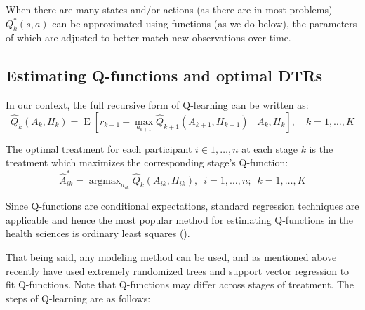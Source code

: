 \documentclass[12pt]{article}
\DeclareMathOperator*{\argmax}{argmax}
\begin{document}
When there are many states and/or actions (as there are in most problems) \( Q^{*}_{k}(s, a) \) can be approximated using functions (as we do below), the parameters of which are adjusted to better match new observations over time. %

\subsection{Estimating Q-functions and optimal DTRs} %
\label{sub:estimating_q_functions}

In our context, the full recursive form of Q-learning can be written as:
  \begin{equation}
     \hat{Q}_{k}(A_{k}, H_{k})  = \operatorname{E}[r_{k+1} + \max_{a_{k+1}} \hat{Q}_{k+1}(A_{k+1}, H_{k+1}) \mid A_{k}, H_{k}], \quad k = 1, \ldots, K
  \end{equation}
  
The optimal treatment for each participant $i \in 1, \ldots, n$ at each stage $k$ is the treatment which maximizes the corresponding stage's Q-function:
  \begin{equation}
    \hat{A}^{*}_{ik} = \argmax_{a_{ik}} \hat{Q}_{k}(A_{ik}, H_{ik}), \enspace i = 1, \ldots, n; \enspace k = 1, \ldots, K
  \end{equation}

Since Q-functions are conditional expectations, standard regression techniques are applicable and hence the most popular method for estimating Q-functions in the health sciences is ordinary least squares (\cite{dtr-review}).

That being said, any modeling method can be used, and as mentioned above recently \textcite{crt} have used extremely randomized trees and support vector regression to fit Q-functions. Note that Q-functions may differ across stages of treatment. The steps of Q-learning are as follows:
\end{document}
